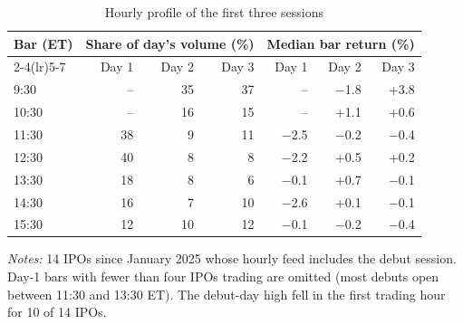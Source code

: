 \begin{table}[!htbp]\centering\small
\caption{Hourly profile of the first three sessions}\label{tab:hourly}

\begin{threeparttable}
\begin{tabular}{lrrrrrr}
\toprule
Bar (ET) & \multicolumn{3}{c}{Share of day's volume (\%)} & \multicolumn{3}{c}{Median bar return (\%)} \\ \cmidrule(lr){2-4}\cmidrule(lr){5-7} & Day 1 & Day 2 & Day 3 & Day 1 & Day 2 & Day 3 \\
\midrule
9:30 & -- & 35 & 37 & -- & $-$1.8 & +3.8 \\
10:30 & -- & 16 & 15 & -- & +1.1 & +0.6 \\
11:30 & 38 & 9 & 11 & $-$2.5 & $-$0.2 & $-$0.4 \\
12:30 & 40 & 8 & 8 & $-$2.2 & +0.5 & +0.2 \\
13:30 & 18 & 8 & 6 & $-$0.1 & +0.7 & $-$0.1 \\
14:30 & 16 & 7 & 10 & $-$2.6 & +0.1 & $-$0.1 \\
15:30 & 12 & 10 & 12 & $-$0.1 & $-$0.2 & $-$0.4 \\
\bottomrule
\end{tabular}
\begin{tablenotes}[flushleft]\footnotesize
\item \textit{Notes:} 14 IPOs since January 2025 whose hourly feed includes the debut session. Day-1 bars with fewer than four IPOs trading are omitted (most debuts open between 11:30 and 13:30 ET). The debut-day high fell in the first trading hour for 10 of 14 IPOs.
\end{tablenotes}
\end{threeparttable}

\end{table}
